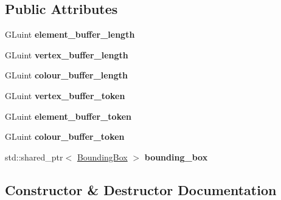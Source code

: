 \subsection*{Public Attributes}
\begin{DoxyCompactItemize}
\item 
\hypertarget{classGameAsset_a3cb33b48d2d1c096b53e6d3e102ec211}{}G\+Luint {\bfseries element\+\_\+buffer\+\_\+length}\label{classGameAsset_a3cb33b48d2d1c096b53e6d3e102ec211}

\item 
\hypertarget{classGameAsset_a5e8cb8663b9fae3dc30ba57e0ac4801b}{}G\+Luint {\bfseries vertex\+\_\+buffer\+\_\+length}\label{classGameAsset_a5e8cb8663b9fae3dc30ba57e0ac4801b}

\item 
\hypertarget{classGameAsset_aa69b81faf889d3e2d5065926d17095b9}{}G\+Luint {\bfseries colour\+\_\+buffer\+\_\+length}\label{classGameAsset_aa69b81faf889d3e2d5065926d17095b9}

\item 
\hypertarget{classGameAsset_a158cf01ef67ae3c0e5c2a8013a364e6d}{}G\+Luint {\bfseries vertex\+\_\+buffer\+\_\+token}\label{classGameAsset_a158cf01ef67ae3c0e5c2a8013a364e6d}

\item 
\hypertarget{classGameAsset_aabbe381c31750767c97d920098118f9b}{}G\+Luint {\bfseries element\+\_\+buffer\+\_\+token}\label{classGameAsset_aabbe381c31750767c97d920098118f9b}

\item 
\hypertarget{classGameAsset_ad62ea82130df02e713181dd3060c36b3}{}G\+Luint {\bfseries colour\+\_\+buffer\+\_\+token}\label{classGameAsset_ad62ea82130df02e713181dd3060c36b3}

\item 
\hypertarget{classGameAsset_a2789834c44a451a857c3c6573604b41f}{}std\+::shared\+\_\+ptr$<$ \hyperlink{classBoundingBox}{Bounding\+Box} $>$ {\bfseries bounding\+\_\+box}\label{classGameAsset_a2789834c44a451a857c3c6573604b41f}

\end{DoxyCompactItemize}


\subsection{Constructor \& Destructor Documentation}
\hypertarget{classGameAsset_af9ed34597a36fb804d2dc94c45ace9e4}{}
